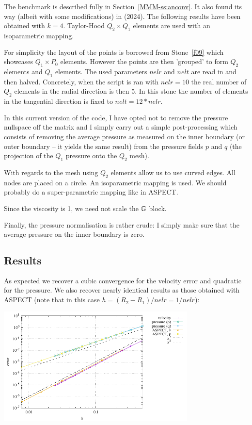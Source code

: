 
The benchmark is described fully in Section~\ref{MMM-ss:anconv}.
It also found its way (albeit with some modifications) in \textcite{gadb24} (2024). 
The following results have been obtained with $k=4$.
Taylor-Hood $Q_2\times Q_1$ elements are used with an isoparametric mapping. 

For simplicity the layout of the points is borrowed from Stone~\ref{f09} which 
showcases $Q_1 \times P_0$ elements. However the points are then 'grouped' 
to form $Q_2$ elements and $Q_1$ elements. 
The used parameters $nelr$ and $nelt$ are read in and then halved. Concretely, 
when the script is ran with $nelr=10$ the real number of $Q_2$ elements 
in the radial direction is then 5. In this stone the number of elements
in the tangential direction is fixed to $nelt=12*nelr$.

In this current version of the code, I have opted not to remove the pressure nullspace
off the matrix and I simply carry out a simple post-processing which consists of 
removing the average pressure as measured on the inner boundary (or outer boundary -- it 
yields the same result) from the pressure fields $p$ and $q$ (the projection of the 
$Q_1$ pressure onto the $Q_2$ mesh). 

With regards to the mesh using $Q_2$ elements allow us to use curved edges.
All nodes are placed on a circle. An isoparametric mapping is used.
We should probably do a super-parametric mapping like in ASPECT. 

Since the viscosity is 1, we need not scale the ${\mathbb{G}}$ block.

Finally, the pressure normalisation is rather crude: I simply make sure that 
the average pressure on the inner boundary is zero.

\subsection*{Results}

As expected we recover a cubic convergence for the velocity error and quadratic for the 
pressure. We also recover nearly identical results as those obtained with ASPECT (note that 
in this case $h=(R_2-R_1)/nelr=1/nelr$): 

\begin{center}
\includegraphics[width=10cm]{python_codes/fieldstone_21/results/errors.pdf}
\end{center}

